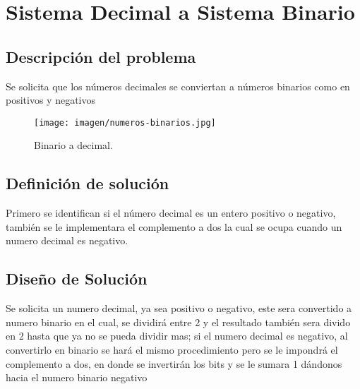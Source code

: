 \section{Sistema Decimal a Sistema Binario}

\subsection{Descripción del problema}
Se solicita que los números decimales se conviertan a números binarios como en positivos y negativos 
\begin {figure}[h!]
\centerline{\texttt{[image: imagen/numeros-binarios.jpg]}}
\caption{Binario a decimal.}
\label{fig}
\end {figure}

\subsection{Definición de solución}
Primero se identifican si el número decimal es un entero positivo o negativo, también se le implementara el complemento a dos la cual se ocupa cuando un numero decimal es negativo.
\subsection{Diseño de Solución}
Se solicita un numero decimal, ya sea positivo o negativo, este  sera convertido a numero binario en el cual, se dividirá entre 2 y el resultado también sera divido en 2 hasta que ya no se pueda dividir mas; si el numero decimal es negativo, al convertirlo en binario se hará el mismo procedimiento pero se le impondrá el complemento a dos, en donde se invertirán los bits y se le sumara 1 dándonos hacia el numero binario negativo 

